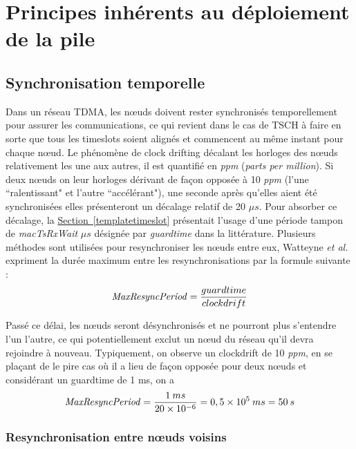 \documentclass[]{report}
\newcommand{\wordlink}[2]{\hyperref[#2]{#1~\ref{#2}}}
\begin{document}
\newpage

\section{Principes inhérents au déploiement de la pile}
	\subsection{Synchronisation temporelle}
	\label{synchrotemp}

	Dans un réseau TDMA, les nœuds doivent rester synchronisés temporellement pour assurer les communications, ce qui revient dans le cas de TSCH à faire en sorte que tous les timeslots soient alignés et commencent au même instant pour chaque nœud. Le phénomène de clock drifting décalant les horloges des nœuds relativement les une aux autres, il est quantifié en \textit{ppm} (\textit{parts per million}). Si deux nœuds on leur horloges dérivant de façon opposée à 10 \textit{ppm} (l'une ``ralentissant" et l'autre ``accélérant"), une seconde après qu'elles aient été synchronisées elles présenteront un décalage relatif de 20 $\mu s$. Pour absorber ce décalage, la \wordlink{Section}{templatetimeslot} présentait l'usage d'une période tampon de \textit{macTsRxWait} $\mu s$ désignée par \textit{guardtime} dans la littérature. Plusieurs méthodes sont utilisées pour resynchroniser les nœuds entre eux, Watteyne \textit{et al.} \cite{openWSN} expriment la durée maximum entre les resynchronisations par la formule suivante :
\vspace{-0.2cm}
\begin{align}
\text{\textit{MaxResyncPeriod}} = \frac{guardtime}{clockdrift}
\end{align}

\par Passé ce délai, les nœuds seront désynchronisés et ne pourront plus s'entendre l'un l'autre, ce qui potentiellement exclut un nœud du réseau qu'il devra rejoindre à nouveau. Typiquement, on observe un clockdrift de 10 \textit{ppm}, en se plaçant de le pire cas où il a lieu de façon opposée pour deux nœuds et considérant un guardtime de 1 ms, on a
\vspace{-0.2cm}
\begin{align*}
\text{\textit{MaxResyncPeriod}} = \frac{1 \: ms}{20 \times 10^{-6}} = 0,5 \times 10^5 \: ms = 50 \: s
\end{align*}
 
\vspace{0.2cm}
\subsubsection{Resynchronisation entre nœuds voisins} 
 
\end{document}
